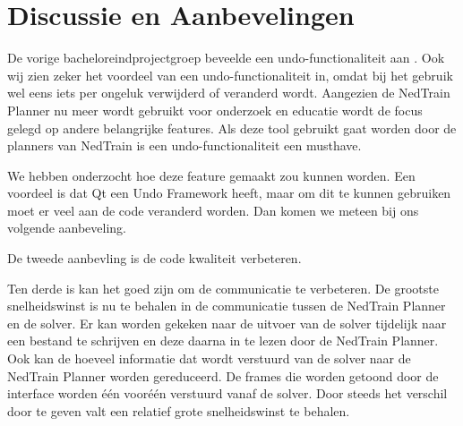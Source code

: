 \section{Discussie en Aanbevelingen}
De vorige bacheloreindprojectgroep beveelde een undo-functionaliteit aan \cite{bep2012nedtrain}. Ook wij zien zeker het voordeel van een undo-functionaliteit in, omdat bij het gebruik wel eens iets per ongeluk verwijderd of veranderd wordt. Aangezien de NedTrain Planner nu meer wordt gebruikt voor onderzoek en educatie wordt de focus gelegd op andere belangrijke features. Als deze tool gebruikt gaat worden door de planners van NedTrain is een undo-functionaliteit een musthave. 

We hebben onderzocht hoe deze feature gemaakt zou kunnen worden. Een voordeel is dat Qt een Undo Framework heeft, maar om dit te kunnen gebruiken moet er veel aan de code veranderd worden. Dan komen we meteen bij ons volgende aanbeveling.

De tweede aanbevling is de code kwaliteit verbeteren. 

Ten derde is kan het goed zijn om de communicatie te verbeteren. De grootste snelheidswinst is nu te behalen in de communicatie tussen de NedTrain Planner en de solver. Er kan worden gekeken naar de uitvoer van de solver tijdelijk naar een bestand te schrijven en deze daarna in te lezen door de NedTrain Planner. Ook kan de hoeveel informatie dat wordt verstuurd van de solver naar de NedTrain Planner worden gereduceerd. De frames die worden getoond door de interface worden \'e\'en voor\'e\'en verstuurd vanaf de solver. Door steeds het verschil door te geven valt een relatief grote snelheidswinst te behalen.
